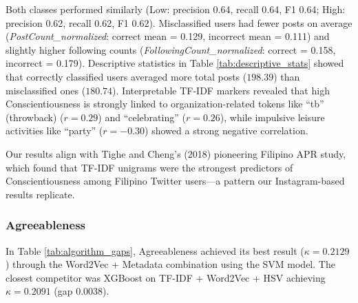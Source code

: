 Both classes performed similarly (Low: precision 0.64, recall 0.64, F1 0.64; High: precision 0.62, recall 0.62, F1 0.62). Misclassified users had fewer posts on average (\textit{PostCount\_normalized}: correct mean = 0.129, incorrect mean = 0.111) and slightly higher following counts (\textit{FollowingCount\_normalized}: correct = 0.158, incorrect = 0.179). Descriptive statistics in Table \ref{tab:descriptive_stats} showed that correctly classified users averaged more total posts 
($198.39$) than misclassified ones ($180.74$). Interpretable TF-IDF markers revealed 
that high Conscientiousness is strongly linked to organization-related tokens like 
``tb'' (throwback) ($r = 0.29$) and ``celebrating'' ($r = 0.26$), while impulsive 
leisure activities like ``party'' ($r = -0.30$) showed a strong negative correlation.

Our results align with Tighe and Cheng's (2018) pioneering Filipino APR study, which found that TF-IDF unigrams were the strongest predictors of Conscientiousness among Filipino Twitter users—a pattern our Instagram-based results replicate. 

\subsubsection{Agreeableness}

In Table \ref{tab:algorithm_gaps}, Agreeableness achieved its best result ($\kappa = 0.2129$) through the Word2Vec + Metadata combination using the SVM model. The closest competitor was XGBoost on TF-IDF + Word2Vec + HSV achieving $\kappa = 0.2091$ (gap $0.0038$).

